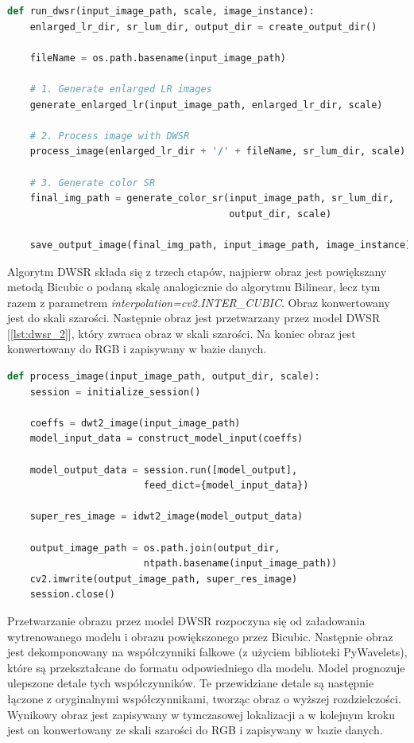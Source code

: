 \begin{lstlisting}[language=Python, caption=Implementacja algorytmu DWSR., label={lst:dwsr}]    
def run_dwsr(input_image_path, scale, image_instance):
    enlarged_lr_dir, sr_lum_dir, output_dir = create_output_dir()

    fileName = os.path.basename(input_image_path)

    # 1. Generate enlarged LR images
    generate_enlarged_lr(input_image_path, enlarged_lr_dir, scale) 

    # 2. Process image with DWSR
    process_image(enlarged_lr_dir + '/' + fileName, sr_lum_dir, scale)

    # 3. Generate color SR
    final_img_path = generate_color_sr(input_image_path, sr_lum_dir, 
                                       output_dir, scale) 

    save_output_image(final_img_path, input_image_path, image_instance)
\end{lstlisting}

Algorytm DWSR składa się z trzech etapów, najpierw obraz jest powiększany metodą Bicubic o podaną skalę analogicznie do algorytmu Bilinear, lecz tym razem z parametrem \textit{interpolation=cv2.INTER\_CUBIC}. Obraz konwertowany jest do skali szarości. Następnie obraz jest przetwarzany przez model DWSR [\ref{lst:dwsr_2}], który zwraca obraz w skali szarości. Na koniec obraz jest konwertowany do RGB i zapisywany w bazie danych.


\begin{lstlisting}[language=Python, caption=Przetwarzanie przez model DWSR., label={lst:dwsr_2}]    
def process_image(input_image_path, output_dir, scale):
    session = initialize_session()

    coeffs = dwt2_image(input_image_path)
    model_input_data = construct_model_input(coeffs)

    model_output_data = session.run([model_output], 
                        feed_dict={model_input_data})
    
    super_res_image = idwt2_image(model_output_data)

    output_image_path = os.path.join(output_dir, 
                        ntpath.basename(input_image_path))
    cv2.imwrite(output_image_path, super_res_image)        
    session.close()

\end{lstlisting}

Przetwarzanie obrazu przez model DWSR rozpoczyna się od załadowania wytrenowanego modelu i obrazu powiększonego przez Bicubic. Następnie obraz jest dekomponowany na współczynniki falkowe (z użyciem biblioteki PyWavelets), które są przekształcane do formatu odpowiedniego dla modelu. Model prognozuje ulepszone detale tych współczynników. 
Te przewidziane detale są następnie łączone z oryginalnymi współczynnikami, tworząc obraz o wyższej rozdzielczości. Wynikowy obraz jest zapisywany w tymczasowej lokalizacji a w kolejnym kroku jest on konwertowany ze skali szarości do RGB i zapisywany w bazie danych.


